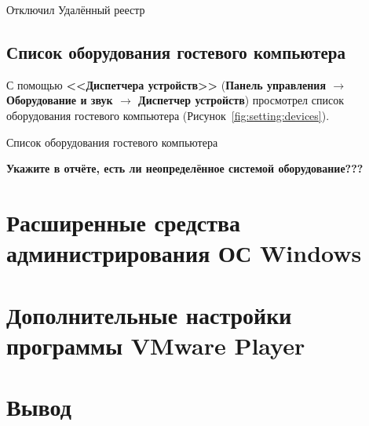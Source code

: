 \begin{image}
	\caption{Отключил Удалённый реестр}
	\label{fig:setting:services:registry}
\end{image}

\subsection{Список оборудования гостевого компьютера}

С помощью \textbf{<<Диспетчера устройств>>}
(\textbf{Панель управления $\rightarrow$ Оборудование и звук
$\rightarrow$ Диспетчер устройств}) просмотрел список оборудования
гостевого компьютера (Рисунок~\ref{fig:setting:devices}).

\begin{image}
	\caption{Список оборудования гостевого компьютера}
	\label{fig:setting:devices}
\end{image}

\textbf{Укажите в отчёте, есть ли неопределённое системой оборудование???}

\clearpage

\section{Расширенные средства администрирования ОС Windows}
\section{Дополнительные настройки программы VMware Player}

\clearpage

\section*{\LARGE Вывод}

